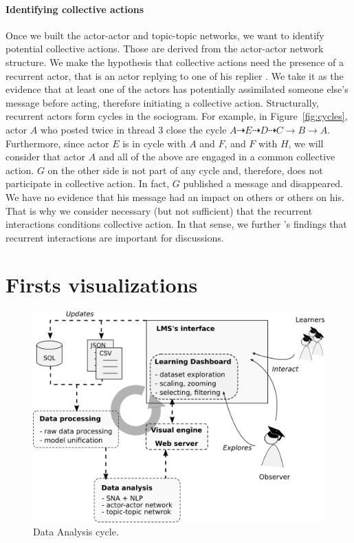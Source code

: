 \documentclass[a4paper,twoside]{article}
\begin{document}
\paragraph{Identifying collective actions}

Once we built the actor-actor and topic-topic networks, we want to identify potential collective actions.  Those are derived from the actor-actor network structure.
We make the hypothesis that collective actions need the presence of a recurrent actor, that is an actor replying to one of his replier \citep{Chua2017}.  We take it as the evidence that at least one of the actors has potentially assimilated someone else's message before acting, therefore initiating a collective action.
Structurally, recurrent actors form cycles in the sociogram.  For example, in Figure~\ref{fig:cycles}, actor $A$ who posted twice in thread 3 close the cycle $A \dashrightarrow E \dashrightarrow D \dashrightarrow C \to B \to A$.  Furthermore, since actor $E$ is in cycle with $A$ and $F$, and $F$ with $H$, we will consider that actor $A$ and all of the above are engaged in a common collective action.  $G$ on the other side is not part of any cycle and, therefore, does not participate in collective action.  In fact, $G$ published a message and disappeared.  We have no evidence that his message had an impact on others or others on his.  That is why we consider necessary (but not sufficient) that the recurrent interactions conditions collective action.   In that sense, we further \cite{Chua2017}'s findings that recurrent interactions are important for discussions.

\section{Firsts visualizations}
\label{section:5}

\begin{figure}[t]
 \includegraphics[width=.5\textwidth]{images/pipeline.png}
 \small{
  \caption{\label{fig:pipeline} Data Analysis cycle.
  }}
\end{figure}
\end{document}
